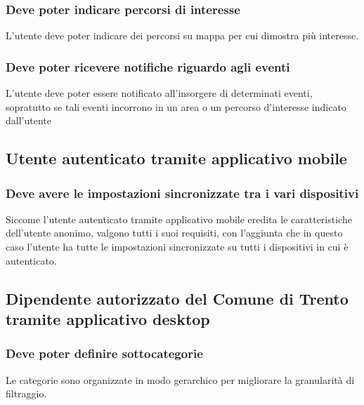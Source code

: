 \documentclass{article}
\begin{document}
\subsubsection{Deve poter indicare percorsi di interesse}
\label{5.1.9}
L'utente deve poter indicare dei percorsi su mappa per cui dimostra più interesse.

\subsubsection{Deve poter ricevere notifiche riguardo agli eventi}
\label{5.1.10}
L'utente deve poter essere notificato all'insorgere di determinati eventi, sopratutto se tali eventi incorrono in un area o un percorso d'interesse indicato dall'utente

\subsection{Utente autenticato tramite applicativo mobile}

\subsubsection{Deve avere le impostazioni sincronizzate tra i vari dispositivi}
\label{5.2.1}
Siccome l'utente autenticato tramite applicativo mobile eredita le caratteristiche dell'utente anonimo, valgono tutti i suoi requisiti, con l'aggiunta che in questo caso l'utente ha tutte le impostazioni sincronizzate su tutti i dispositivi in cui è autenticato.

\subsection{Dipendente autorizzato del Comune di Trento tramite applicativo desktop}

\subsubsection{Deve poter definire sottocategorie}
\label{5.3.1}
Le categorie sono organizzate in modo gerarchico per migliorare la granularità di filtraggio.
\end{document}
